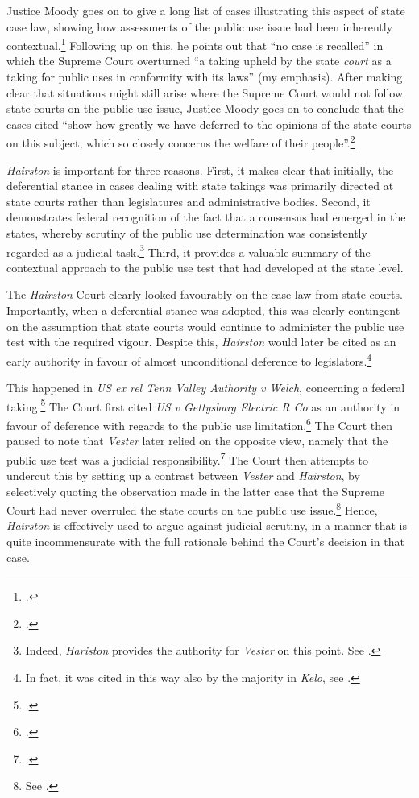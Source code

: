 Justice Moody goes on to give a long list of cases illustrating this aspect of state case law, showing how assessments of the public use issue had been inherently contextual.\footcite[607]{hairston08} %
Following up on this, he points out that ``no case is recalled'' in which the Supreme Court overturned ``a taking upheld by the state {\it court} as a taking for public uses in conformity with its laws'' (my emphasis). After making clear that situations might still arise where the Supreme Court would not follow state courts on the public use issue, Justice Moody goes on to conclude that the cases cited ``show how greatly we have deferred to the opinions of the state courts on this subject, which so closely concerns the welfare of their people''.\footcite[606]{hairston08}

{\it Hairston} is important for three reasons. First, it makes clear that initially, the deferential stance in cases dealing with state takings was primarily directed at state courts rather than legislatures and administrative bodies. Second, it demonstrates federal recognition of the fact that a consensus had emerged in the states, whereby scrutiny of the public use determination was consistently regarded as a judicial task.\footnote{Indeed, {\it Hariston} provides the authority for {\it Vester} on this point. See \cite[606]{vester30}.} Third, it provides a valuable summary of the contextual approach to the public use test that had developed at the state level. 

The {\it Hairston} Court clearly looked favourably on the case law from state courts. Importantly, when a deferential stance was adopted, this was clearly contingent on the assumption that state courts would continue to administer the public use test with the required vigour. Despite this, {\it Hairston} would later be cited as an early authority in favour of almost unconditional deference to legislators.\footnote{In fact, it was cited in this way also by the majority in {\it Kelo}, see \cite[482-483]{kelo05}.} 

This happened in {\it US ex rel Tenn Valley Authority v Welch}, concerning a federal taking.\footcite[552]{welch46} The Court first cited {\it US v Gettysburg Electric R Co} as an authority in favour of deference with regards to the public use limitation.\footcite{gettysburg96} The Court then paused to note that {\it Vester} later relied on the opposite view, namely that the public use test was a judicial responsibility.\footcite{vester30} The Court then attempts to undercut this by setting up a contrast between {\it Vester} and {\it Hairston}, by selectively quoting the observation made in the latter case that the Supreme Court had never overruled the state courts on the public use issue.\footnote{See \cite[552]{welch46}.} Hence, {\it Hairston} is effectively used to argue against judicial scrutiny, in a manner that is quite incommensurate with the full rationale behind the Court's decision in that case.

